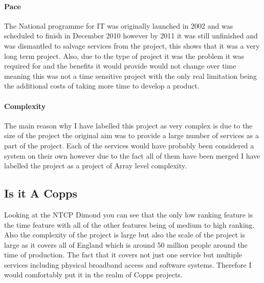\documentclass[a4paper,12pt]{scrartcl}
\begin{document}
{{			\paragraph{Pace}
			{
				The National programme for IT was originally launched in 2002 and was scheduled to finish in December 2010 however by 2011 it was still unfinished and was dismantled to salvage services from the project, this shows that it was a very long term project. Also, due to the type of project it was the problem it was required for and the benefits it would provide would not change over time meaning this was not a time sensitive project with the only real limitation being the additional costs of taking more time to develop a product.
			}
			\paragraph{Complexity}
			{
				The main reason why I have labelled this project as very complex is due to the size of the project the original aim was to provide a large number of services as a part of the project. Each of the services would have probably been considered a system on their own however due to the fact all of them have been merged I have labelled the project as a project of Array level complexity.
			}
		}
		\subsection{Is it A Copps}
		{
			Looking at the NTCP Dimond you can see that the only low ranking feature is the time feature with all of the other features being of medium to high ranking. Also the complexity of the project is large but also the scale of the project is large as it covers all of England which is around 50 million people around the time of production\cite{NationalStatistics2018}. The fact that it covers not just one service but multiple services including physical broadband access\cite{Health2002} and software systems. Therefore I would comfortably put it in the realm of Copps projects. 
		}
	}
\end{document}
